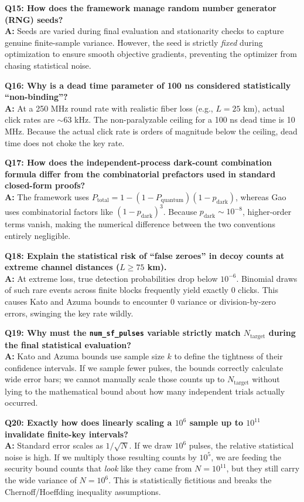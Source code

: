 \documentclass[11pt, a4paper]{article}
\begin{document}
\textbf{Q15: How does the framework manage random number generator (RNG) seeds?} \\
\textbf{A:} Seeds are varied during final evaluation and stationarity checks to capture genuine finite-sample variance. However, the seed is strictly \textit{fixed} during optimization to ensure smooth objective gradients, preventing the optimizer from chasing statistical noise.

\textbf{Q16: Why is a dead time parameter of 100 ns considered statistically ``non-binding''?} \\
\textbf{A:} At a 250 MHz round rate with realistic fiber loss (e.g., $L=25$ km), actual click rates are $\sim 63$ kHz. The non-paralyzable ceiling for a 100 ns dead time is 10 MHz. Because the actual click rate is orders of magnitude below the ceiling, dead time does not choke the key rate.

\textbf{Q17: How does the independent-process dark-count combination formula differ from the combinatorial prefactors used in standard closed-form proofs?} \\
\textbf{A:} The framework uses $P_{\text{total}} = 1-(1-P_{\text{quantum}})(1-p_{\text{dark}})$, whereas Gao uses combinatorial factors like $(1-p_{\text{dark}})^3$. Because $p_{\text{dark}} \sim 10^{-8}$, higher-order terms vanish, making the numerical difference between the two conventions entirely negligible.

\textbf{Q18: Explain the statistical risk of ``false zeroes'' in decoy counts at extreme channel distances ($L \ge 75$ km).} \\
\textbf{A:} At extreme loss, true detection probabilities drop below $10^{-6}$. Binomial draws of such rare events across finite blocks frequently yield exactly 0 clicks. This causes Kato and Azuma bounds to encounter 0 variance or division-by-zero errors, swinging the key rate wildly.

\textbf{Q19: Why must the \texttt{num\_sf\_pulses} variable strictly match $N_{\text{target}}$ during the final statistical evaluation?} \\
\textbf{A:} Kato and Azuma bounds use sample size $k$ to define the tightness of their confidence intervals. If we sample fewer pulses, the bounds correctly calculate wide error bars; we cannot manually scale those counts up to $N_{\text{target}}$ without lying to the mathematical bound about how many independent trials actually occurred.

\textbf{Q20: Exactly how does linearly scaling a $10^6$ sample up to $10^{11}$ invalidate finite-key intervals?} \\
\textbf{A:} Standard error scales as $1/\sqrt{N}$. If we draw $10^6$ pulses, the relative statistical noise is high. If we multiply those resulting counts by $10^5$, we are feeding the security bound counts that \textit{look} like they came from $N=10^{11}$, but they still carry the wide variance of $N=10^6$. This is statistically fictitious and breaks the Chernoff/Hoeffding inequality assumptions.
\end{document}
